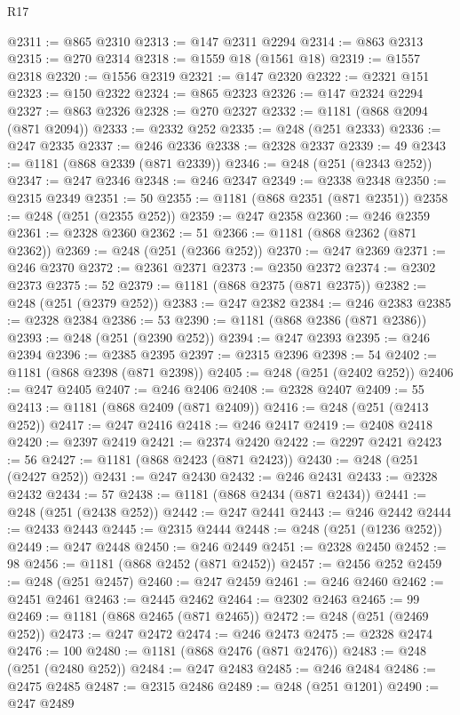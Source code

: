 \begin{lexlean}{R17}
\begin{coremodule}
@2311 := @865 @2310
@2313 := @147 @2311 @2294
@2314 := @863 @2313
@2315 := @270 @2314
@2318 := @1559 @18 (@1561 @18)
@2319 := @1557 @2318
@2320 := @1556 @2319
@2321 := @147 @2320
@2322 := @2321 @151
@2323 := @150 @2322
@2324 := @865 @2323
@2326 := @147 @2324 @2294
@2327 := @863 @2326
@2328 := @270 @2327
@2332 := @1181 (@868 @2094 (@871 @2094))
@2333 := @2332 @252
@2335 := @248 (@251 @2333)
@2336 := @247 @2335
@2337 := @246 @2336
@2338 := @2328 @2337
@2339 := 49
@2343 := @1181 (@868 @2339 (@871 @2339))
@2346 := @248 (@251 (@2343 @252))
@2347 := @247 @2346
@2348 := @246 @2347
@2349 := @2338 @2348
@2350 := @2315 @2349
@2351 := 50
@2355 := @1181 (@868 @2351 (@871 @2351))
@2358 := @248 (@251 (@2355 @252))
@2359 := @247 @2358
@2360 := @246 @2359
@2361 := @2328 @2360
@2362 := 51
@2366 := @1181 (@868 @2362 (@871 @2362))
@2369 := @248 (@251 (@2366 @252))
@2370 := @247 @2369
@2371 := @246 @2370
@2372 := @2361 @2371
@2373 := @2350 @2372
@2374 := @2302 @2373
@2375 := 52
@2379 := @1181 (@868 @2375 (@871 @2375))
@2382 := @248 (@251 (@2379 @252))
@2383 := @247 @2382
@2384 := @246 @2383
@2385 := @2328 @2384
@2386 := 53
@2390 := @1181 (@868 @2386 (@871 @2386))
@2393 := @248 (@251 (@2390 @252))
@2394 := @247 @2393
@2395 := @246 @2394
@2396 := @2385 @2395
@2397 := @2315 @2396
@2398 := 54
@2402 := @1181 (@868 @2398 (@871 @2398))
@2405 := @248 (@251 (@2402 @252))
@2406 := @247 @2405
@2407 := @246 @2406
@2408 := @2328 @2407
@2409 := 55
@2413 := @1181 (@868 @2409 (@871 @2409))
@2416 := @248 (@251 (@2413 @252))
@2417 := @247 @2416
@2418 := @246 @2417
@2419 := @2408 @2418
@2420 := @2397 @2419
@2421 := @2374 @2420
@2422 := @2297 @2421
@2423 := 56
@2427 := @1181 (@868 @2423 (@871 @2423))
@2430 := @248 (@251 (@2427 @252))
@2431 := @247 @2430
@2432 := @246 @2431
@2433 := @2328 @2432
@2434 := 57
@2438 := @1181 (@868 @2434 (@871 @2434))
@2441 := @248 (@251 (@2438 @252))
@2442 := @247 @2441
@2443 := @246 @2442
@2444 := @2433 @2443
@2445 := @2315 @2444
@2448 := @248 (@251 (@1236 @252))
@2449 := @247 @2448
@2450 := @246 @2449
@2451 := @2328 @2450
@2452 := 98
@2456 := @1181 (@868 @2452 (@871 @2452))
@2457 := @2456 @252
@2459 := @248 (@251 @2457)
@2460 := @247 @2459
@2461 := @246 @2460
@2462 := @2451 @2461
@2463 := @2445 @2462
@2464 := @2302 @2463
@2465 := 99
@2469 := @1181 (@868 @2465 (@871 @2465))
@2472 := @248 (@251 (@2469 @252))
@2473 := @247 @2472
@2474 := @246 @2473
@2475 := @2328 @2474
@2476 := 100
@2480 := @1181 (@868 @2476 (@871 @2476))
@2483 := @248 (@251 (@2480 @252))
@2484 := @247 @2483
@2485 := @246 @2484
@2486 := @2475 @2485
@2487 := @2315 @2486
@2489 := @248 (@251 @1201)
@2490 := @247 @2489

\end{coremodule}
\end{lexlean}
